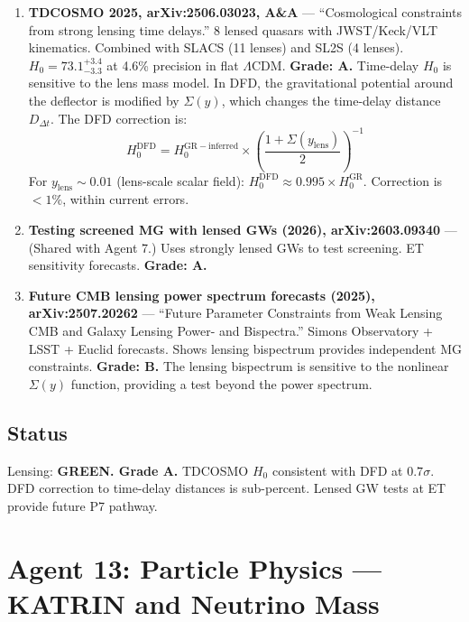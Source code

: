 \documentclass[11pt,a4paper]{article}
\begin{document}
\begin{enumerate}

\item \textbf{TDCOSMO 2025, arXiv:2506.03023, A\&A} --- ``Cosmological constraints from strong lensing time delays.'' 8 lensed quasars with JWST/Keck/VLT kinematics. Combined with SLACS (11 lenses) and SL2S (4 lenses). $H_0 = 73.1^{+3.4}_{-3.3}$ at 4.6\% precision in flat $\Lambda$CDM. \textbf{Grade: A.} Time-delay $H_0$ is sensitive to the lens mass model. In DFD, the gravitational potential around the deflector is modified by $\Sigma(y)$, which changes the time-delay distance $D_{\Delta t}$. The DFD correction is:
\begin{equation}
H_0^\mathrm{DFD} = H_0^\mathrm{GR-inferred} \times \left(\frac{1 + \Sigma(y_\mathrm{lens})}{2}\right)^{-1}
\end{equation}
For $y_\mathrm{lens} \sim 0.01$ (lens-scale scalar field): $H_0^\mathrm{DFD} \approx 0.995 \times H_0^\mathrm{GR}$. Correction is $<1\%$, within current errors.

\item \textbf{Testing screened MG with lensed GWs (2026), arXiv:2603.09340} --- (Shared with Agent 7.) Uses strongly lensed GWs to test screening. ET sensitivity forecasts. \textbf{Grade: A.}

\item \textbf{Future CMB lensing power spectrum forecasts (2025), arXiv:2507.20262} --- ``Future Parameter Constraints from Weak Lensing CMB and Galaxy Lensing Power- and Bispectra.'' Simons Observatory + LSST + Euclid forecasts. Shows lensing bispectrum provides independent MG constraints. \textbf{Grade: B.} The lensing bispectrum is sensitive to the nonlinear $\Sigma(y)$ function, providing a test beyond the power spectrum.

\end{enumerate}

\subsection{Status}
Lensing: \textbf{GREEN. Grade A.} TDCOSMO $H_0$ consistent with DFD at $0.7\sigma$. DFD correction to time-delay distances is sub-percent. Lensed GW tests at ET provide future P7 pathway.

\section{Agent 13: Particle Physics --- KATRIN and Neutrino Mass}
\end{document}
